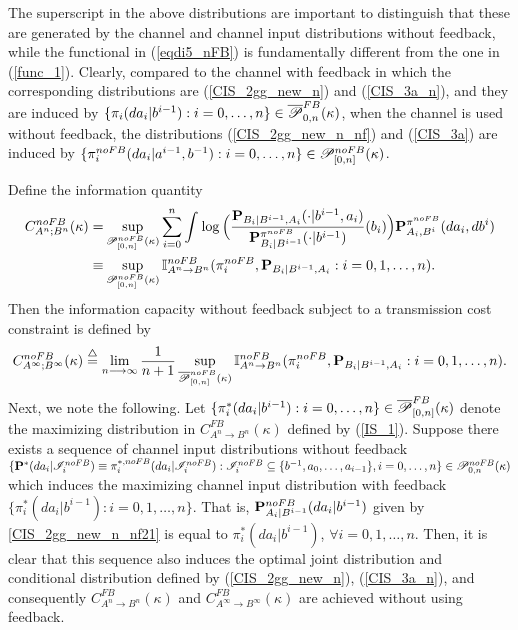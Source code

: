 \documentclass[11pt, a4paper, journal,onecolumn]{IEEEtran}
\newcommand{\sr}{\stackrel}
\newcommand{\rar}{\rightarrow}
\newcommand{\tri}{\sr{\triangle}{=}}
\begin{document}
The superscript in the above distributions are important to distinguish that these are generated by the channel and channel input distributions without feedback, while the functional in (\ref{eqdi5_nFB}) is fundamentally different from the one in (\ref{func_1}). Clearly, compared to the channel with feedback in which the corresponding distributions are  (\ref{CIS_2gg_new_n}) and (\ref{CIS_3a_n}), and they are induced by $\{\pi_i(da_i|b^{i-1}): i=0, \ldots, n\} \in \overline{\cal P}_{0,n}^{FB}(\kappa)$, when  the channel is used without feedback, the distributions (\ref{CIS_2gg_new_n_nf}) and (\ref{CIS_3a}) are induced by $\{\pi_i^{noFB}(da_i|a^{i-1},b^{-1}): i=0, \ldots, n\} \in {\cal P}_{[0,n]}^{noFB}(\kappa)$. 
\par Define the information quantity 
\begin{align}
C_{A^n ; B^n}^{noFB}(\kappa)=& \sup_{ {\cal P}_{[0,n]}^{noFB}(\kappa) } \sum_{i=0}^n \int_{  }^{}   \log \Big( \frac{ {\bf P}_{B_i|B^{i-1}, A_i}(\cdot|b^{i-1}, a_i) }{{\bf P}_{B_i|B^{i-1}}^{\pi^{noFB}}(\cdot|b^{i-1})}(b_i)\Big){ \bf P}_{A_i, B^i}^{\pi^{noFB}}( da_i, db^i) \label{IS_1_nfb} \\
\equiv & \sup_{{\cal P}_{[0,n]}^{noFB}(\kappa)  }  {\mathbb I}_{A^n \rar B^n}^{noFB}(\pi_i^{noFB},  {\bf P}_{B_i|B^{i-1},A_i}: i=0,1, \ldots, n).       
\end{align}  
Then the information capacity without feedback subject to a transmission cost constraint is defined by 
\begin{align}
C_{A^\infty ; B^\infty}^{noFB}(\kappa) \tri \lim_{n \longrightarrow \infty} \frac{1}{n+1} \sup_{ \overline{\cal P}_{[0,n]}^{noFB}(\kappa)  }  {\mathbb I}_{A^n \rar B^n}^{noFB}(\pi_i^{noFB},  {\bf P}_{B_i|B^{i-1},A_i}: i=0,1, \ldots, n).  \label{ifc_1_noFB}      
\end{align}
Next, we note the following. Let $\{\pi_i^*(da_i|b^{i-1}): i=0, \ldots, n\} \in \overline{\cal P}_{[0,n]}^{FB}(\kappa)$ denote the maximizing distribution  in $C_{A^n \rar B^n}^{FB}(\kappa)$ defined by (\ref{IS_1}). Suppose there exists a sequence of channel  input distributions without feedback $\{{\bf P}^*(da_i| {\cal I}_i^{noFB})\equiv \pi_i^{*,noFB}(da_i|{\cal I}_i^{noFB}): {\cal I}_i^{noFB} \subseteq \{b^{-1}, a_0, \ldots, a_{i-1}\}, i=0, \ldots,n\} \in {\cal P}_{0,n}^{noFB}(\kappa)$ 
 which induces the maximizing channel input distribution with feedback 
$\{\pi^*_i(da_i|b^{i-1}): i=0,1, \ldots, n\}$. That is, ${\bf P}_{A_i|B^{i-1}}^{noFB}(da_i|b^{i-1})$  given by \eqref{CIS_2gg_new_n_nf21} is equal to $\pi_i^*(da_i|b^{i-1})$, $\forall i=0,1,\ldots,n$. Then, it is clear that this sequence also induces the optimal joint distribution and conditional distribution defined by   (\ref{CIS_2gg_new_n}), (\ref{CIS_3a_n}), and consequently $C_{A^n \rar B^n}^{FB}(\kappa)$ and $C_{A^\infty \rar B^\infty}^{FB}(\kappa)$ are achieved without using feedback. 
\end{document}
